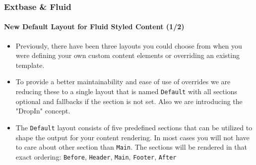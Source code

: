 
\begin{frame}[fragile]
	\frametitle{Extbase \& Fluid}
	\framesubtitle{New Default Layout for Fluid Styled Content (1/2)}

	\begin{itemize}
		\item Previously, there have been three layouts you could
			choose from when you were defining your own custom content
			elements or overriding an existing template.

		\item To provide a better maintainability and ease of use of overrides
			we are reducing these to a single layout that is named \texttt{Default}
			with all sections optional and fallbacks if the section is not set. Also
			we are introducing the "DropIn" concept.

		\item The \texttt{Default} layout consists of five predefined sections
			that can be utilized to shape the output for your content rendering.
			In most cases you will not have to care about other section than
			\texttt{Main}. The sections will be rendered in that exact ordering:
			\texttt{Before}, \texttt{Header}, \texttt{Main}, \texttt{Footer}, \texttt{After}
	\end{itemize}

\end{frame}


